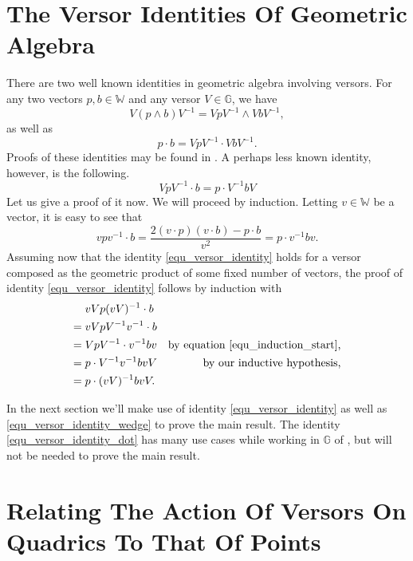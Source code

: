 \documentclass{birkjour}
\theoremstyle{definition}
\theoremstyle{remark}
\numberwithin{equation}{section}
\newcommand{\G}{\mathbb{G}}
\newcommand{\W}{\mathbb{W}}
\begin{document}
\section{The Versor Identities Of Geometric Algebra}

There are two well known identities in geometric algebra involving versors.
For any two vectors $p,b\in\W$ and any versor $V\in\G$, we have
\begin{equation}\label{equ_versor_identity_wedge}
V(p\wedge b)V^{-1} = VpV^{-1}\wedge VbV^{-1},
\end{equation}
as well as
\begin{equation}\label{equ_versor_identity_dot}
p\cdot b = VpV^{-1}\cdot VbV^{-1}.
\end{equation}
Proofs of these identities may be found in \cite{Parkin12_intro}.
A perhaps less known identity, however, is the following.
\begin{equation}\label{equ_versor_identity}
VpV^{-1}\cdot b = p\cdot V^{-1}bV
\end{equation}
Let us give a proof of it now.  We will proceed by induction.
Letting $v\in\W$ be a vector, it is easy to see that
\begin{equation}\label{equ_induction_start}
vpv^{-1}\cdot b = \frac{2(v\cdot p)(v\cdot b) - p\cdot b}{v^2} = p\cdot v^{-1}bv.
\end{equation}
Assuming now that the identity \eqref{equ_versor_identity} holds for a versor
composed as the geometric product of some fixed number of vectors, the proof of identity
\eqref{equ_versor_identity} follows by induction with
\begin{align}
& vVp(vV)^{-1}\cdot b \\
=\;& vVpV^{-1}v^{-1}\cdot b \\
=\;& VpV^{-1}\cdot v^{-1}bv & \mbox{by equation \eqref{equ_induction_start},} \\
=\;& p\cdot V^{-1}v^{-1}bvV & \mbox{by our inductive hypothesis,} \\
=\;& p\cdot (vV)^{-1}bvV.
\end{align}

In the next section we'll make use of identity \eqref{equ_versor_identity} as well as
\eqref{equ_versor_identity_wedge} to prove the main result.  The identity
\eqref{equ_versor_identity_dot} has many use cases while working in $\G$
of \cite{Parkin12}, but will not be needed to prove the main result.

\section{Relating The Action Of Versors On Quadrics To That Of Points}
\end{document}
